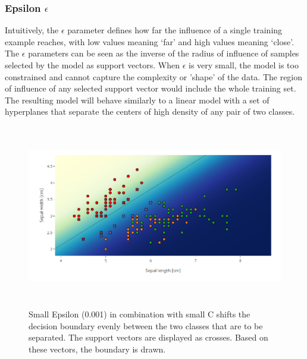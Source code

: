 \documentclass{scrartcl}
\begin{document}
\subsubsection*{Epsilon $\epsilon$}
Intuitively, the $\epsilon$ parameter defines how far the influence of a single training example reaches, with low values meaning ‘far’ and high values meaning ‘close’. The $\epsilon$ parameters can be seen as the inverse of the radius of influence of samples selected by the model as support vectors. When $\epsilon$ is very small, the model is too constrained and cannot capture the complexity or 'shape' of the data. The region of influence of any selected support vector would include the whole training set. The resulting model will behave similarly to a linear model with a set of hyperplanes that separate the centers of high density of any pair of two classes. 

\begin{figure}%
	\centering
	\includegraphics[height=8cm]{IrisLin001_1}
	\caption{Small Epsilon (0.001) in combination with small C shifts the decision boundary evenly between the two classes that are to be separated. The support vectors are displayed as crosses. Based on these vectors, the boundary is drawn.}
	\label{fig:example}%
\end{figure}
\end{document}
